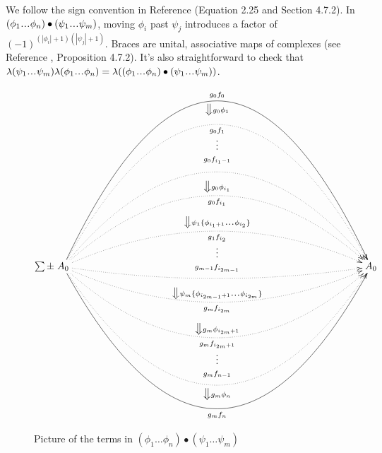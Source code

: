 %
We follow the sign convention in 
Reference \cite{T} (Equation 2.25 and 
Section 4.7.2). In $(\phi_1\smdots\phi_n) 
\bullet (\psi_1\smdots\psi_m)$, moving 
$\phi_i$ past $\psi_j$ introduces a factor of 
$(-1)^{(|\phi_i|+1)(|\psi_j|+1)}$. Braces 
are unital, associative maps of complexes 
(see Reference \cite{T}, Proposition 4.7.2). 
It's also straightforward to check that 
$\lambda(\psi_1\smdots \psi_m)
\lambda(\phi_1 \smdots \phi_n) = 
\lambda((\phi_1\smdots \phi_n) \bullet
(\psi_1 \smdots \psi_m))$.
\begin{figure}
$\sum \pm
\xymatrix{
A_0 
\ar@/^14pc/[rrrrrrrrrr]^{g_0f_0}_{\big\Downarrow g_0\phi_1}
\ar@{.>}@/^12pc/[rrrrrrrrrr]_{\substack{
  g_0f_1\\ \vdots\\\\g_0f_{i_1-1}}} 
\ar@{.>}@/^8pc/[rrrrrrrrrr]
\ar@{.>}@/^6pc/[rrrrrrrrrr]^{\big\Downarrow g_0\phi_{i_1}}_{g_0f_{i_1}}
\ar@{.>}@/^3pc/[rrrrrrrrrr]^{\big\Downarrow 
  \psi_1\{\phi_{i_1+1}\smdots \phi_{i_2}\}}_{\substack{
  g_1f_{i_2}\\ \vdots \\\\ g_{m-1}f_{i_{2m-1}}}}
\ar@{.>}@/_1pc/[rrrrrrrrrr]
\ar@{.>}@/_3pc/[rrrrrrrrrr]^{\big\Downarrow 
 \psi_m\{\phi_{i_{2m-1}+1}\smdots \phi_{i_{2m}}\}}_{g_m
 f_{i_{2m}}}
\ar@{.>}@/_6pc/[rrrrrrrrrr]^{\big\Downarrow g_m
  \phi_{i_{2m}+1}}_{\substack{
  g_mf_{i_{2m}+1}\\ \vdots\\\\g_mf_{n-1} }} 
\ar@{.>}@/_10pc/[rrrrrrrrrr]_{\big\Downarrow g_m\phi_n}
\ar@/_12pc/[rrrrrrrrrr]_{g_mf_n}
&&&&&&&&&& A_0  
}$
\caption{Picture of the terms in 
$(\phi_1\dots\phi_n) \bullet (\psi_1\dots\psi_m)$}
\label{fig:braces}
\end{figure}